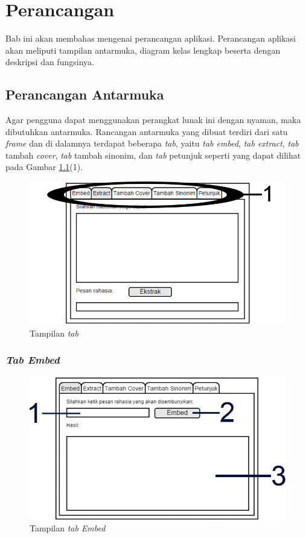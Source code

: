 \chapter{Perancangan}
Bab ini akan membahas mengenai perancangan aplikasi. Perancangan aplikasi akan meliputi tampilan antarmuka, diagram kelas lengkap beserta dengan deskripsi dan fungsinya.

\section{Perancangan Antarmuka}
\label{perancangan_antarmuka}

Agar pengguna dapat menggunakan perangkat lunak ini dengan nyaman, maka dibutuhkan antarmuka. Rancangan antarmuka yang dibuat terdiri dari satu \textit{frame} dan di dalamnya terdapat beberapa \textit{tab}, yaitu \textit{tab embed}, \textit{tab extract}, \textit{tab} tambah \textit{cover}, \textit{tab} tambah sinonim, dan \textit{tab} petunjuk seperti yang dapat dilihat pada Gambar \ref{fig:0-tab}(1).

\begin{figure}[H]
	\centering
	\includegraphics[scale=1.8]{Gambar/tab}
	\caption{Tampilan \textit{tab}} 
	\label{fig:0-tab}
\end{figure}

\subsection{\textit{Tab Embed}}

\begin{figure}[H]
	\centering
	\includegraphics[scale=1.8]{Gambar/tab-embed}
	\caption{Tampilan \textit{tab Embed}} 
	\label{fig:1-tab-embed}
\end{figure}

